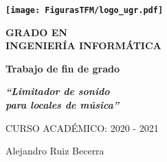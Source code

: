 \begin{center}
\textbf{\huge \texttt{[image: FigurasTFM/logo\_ugr.pdf]}}
\par\end{center}{\huge \par}

\begin{center}
\vspace*{1cm}
\par\end{center}

\begin{center}
\textbf{\large GRADO EN}\\
\textbf{\large INGENIERÍA INFORMÁTICA}
\par\end{center}{\large \par}

\begin{center}
\textbf{\large Trabajo de fin de grado}
\par\end{center}{\large \par}

\begin{center}

\par\end{center}

\begin{center}
\textbf{\emph{\LARGE {}``Limitador de sonido}}\\
\textbf{\emph{\LARGE {} para locales de música''}}

\par\end{center}{\LARGE \par}

\begin{center}
\vspace*{3cm}
\par\end{center}

\begin{center}
{\large CURSO ACADÉMICO: 2020 - 2021}
\par\end{center}{\large \par}

\begin{center}
{\large Alejandro Ruiz Becerra}
\par\end{center}{\large \par}

